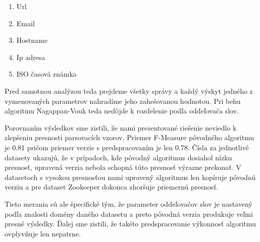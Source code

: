 \begin{enumerate}
  \item Url
  \item Email
  \item Hostname
  \item Ip adresa
  \item ISO časová známka
\end{enumerate}

Pred samotnou analýzou teda prejdeme všetky správy a každý výskyt jedného z vymenovaných parametrov nahradíme jeho zahešovanou hodnotou. Pri behu algoritmu Nagappan-Vouk teda nedôjde k rozdelenie podľa oddeľovača slov. 
\par Porovnaním výsledkov sme zistili, že nami prezentované riešenie neviedlo k zlepšeniu presnosti parsovacích vzorov. Priemer F-Measure pôvodného algoritmu je 0.81 pričom priemer verzie s predspracovaním je len 0.78. Čísla za jednotlivé datasety ukazujú, že v prípadoch, kde pôvodný algoritmus dosiahol nízku presnosť, upravená verzia nebola schopná túto presnosť výrazne prekonať. V datasetoch s vysokou presnosťou nami upravený algoritmus len kopíruje pôvodnú verziu a pre dataset Zookeeper dokonca zhoršuje priemernú presnosť. 
\par Tieto merania sú ale špecifické tým, že parameter oddeľovačov slov je nastavený podľa znalosti domény daného datasetu a preto pôvodná verzia produkuje veľmi presné výsledky. Ďalej sme zistili, že takéto predspracovanie výkonnosť algoritmu ovplyvňuje len nepatrne.